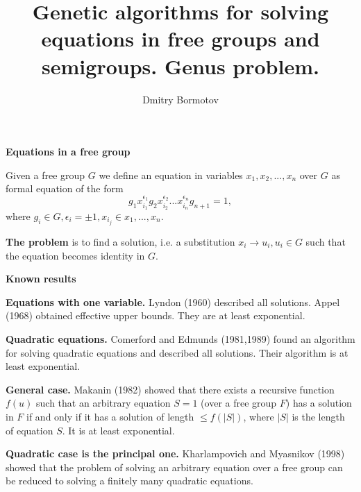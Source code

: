 \documentclass[12pt]{slides}
\title{Genetic algorithms for solving
equations in free groups and semigroups.  Genus problem.}
\author{Dmitry Bormotov} \date{}
\begin{document}

\begin{center} \Large\textbf{Equations in a free group} \end{center}
\vspace{12mm}

Given a free group $G$ we define an equation in variables
$x_1,x_2,...,x_n$ over $G$ as formal equation of the form
\[
g_1 x_{i_1}^{\epsilon_1} g_2 x_{i_2}^{\epsilon_2} ... x_{i_n}^{\epsilon_n} g_{n+1} = 1,
\]
where $g_i \in G, \epsilon_i = \pm 1, x_{i_j} \in {x_1,...,x_n}$. 

\vspace{5mm}
{\bf The problem} is to find a solution, i.e. a substitution $x_i
\rightarrow u_i, u_i \in G$ such that the equation becomes identity in
$G$.

\newpage

\begin{center} \Large\textbf{Known results} \end{center}

\vspace{5mm}
{\bf Equations with one variable.} Lyndon (1960) described all
solutions. Appel (1968) obtained effective upper bounds. They
are at least exponential.

{\bf Quadratic equations.} Comerford and Edmunds (1981,1989) found an
algorithm for solving quadratic equations and described all
solutions. Their algorithm is at least exponential.

{\bf General case.} Makanin (1982) showed that there exists a
recursive function $f(u)$ such that an arbitrary equation $S = 1$
(over a free group $F$) has a solution in $F$ if and only if it has a
solution of length $ \le f(|S|)$, where $|S|$ is the length of
equation $S$. It is at least exponential.

{\bf Quadratic case is the principal one.} Kharlampovich and Myasnikov 
(1998) showed that the problem of solving an arbitrary equation over a free
group can be reduced to solving a finitely many quadratic equations.
\end{document}

